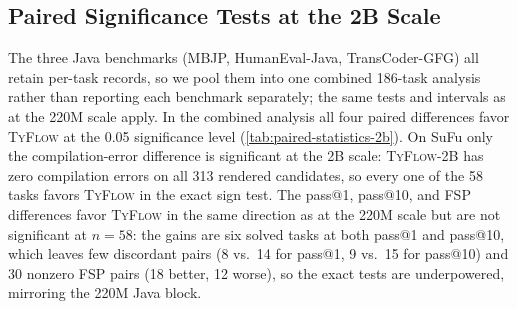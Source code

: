 \documentclass[manuscript,screen]{acmart}
\newcommand{\toolname}[1]{\textsc{#1}}
\newcommand{\mainname}{\toolname{TyFlow}\xspace}
\begin{document}
\subsection{{\color{revblue}Paired Significance Tests at the 2B Scale}}
\label{appendix-statistics-2b}

{\color{revblue}The three Java benchmarks (MBJP, HumanEval-Java, TransCoder-GFG) all retain per-task records, so we pool them into one combined 186-task analysis rather than reporting each benchmark separately; the same tests and intervals as at the 220M scale apply.
In the combined analysis all four paired differences favor }\mainname{} {\color{revblue}at the 0.05 significance level (}\autoref{tab:paired-statistics-2b}{\color{revblue}).
On SuFu only the compilation-error difference is significant at the 2B scale: }\mainname{\color{revblue}-2B has zero compilation errors on all 313 rendered candidates, so every one of the 58 tasks favors }\mainname{} {\color{revblue}in the exact sign test.
The pass@1, pass@10, and FSP differences favor }\mainname{} {\color{revblue}in the same direction as at the 220M scale but are not significant at $n=58$: the gains are six solved tasks at both pass@1 and pass@10, which leaves few discordant pairs (8 vs.\ 14 for pass@1, 9 vs.\ 15 for pass@10) and 30 nonzero FSP pairs (18 better, 12 worse), so the exact tests are underpowered, mirroring the 220M Java block.
}
\end{document}
